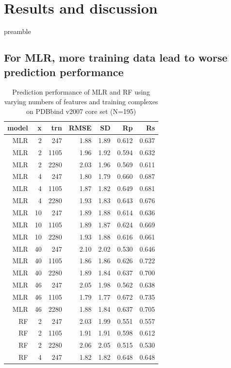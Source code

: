 \documentclass[journal=jacsat,manuscript=article]{achemso}
\begin{document}
\section{Results and discussion}

preamble

\subsection{For MLR, more training data lead to worse prediction performance}

\begin{table}
\caption{Prediction performance of MLR and RF using varying numbers of features and training complexes on PDBbind v2007 core set (N=195)}
\label{tbl:performance}
\begin{tabular}{rrrrrrr}
\hline
model & x & trn & RMSE & SD & Rp & Rs\\
\hline
MLR &  2 &  247 & 1.88 & 1.89 & 0.612 & 0.637\\
MLR &  2 & 1105 & 1.96 & 1.92 & 0.594 & 0.632\\
MLR &  2 & 2280 & 2.03 & 1.96 & 0.569 & 0.611\\
MLR &  4 &  247 & 1.80 & 1.79 & 0.660 & 0.687\\
MLR &  4 & 1105 & 1.87 & 1.82 & 0.649 & 0.681\\
MLR &  4 & 2280 & 1.93 & 1.83 & 0.643 & 0.676\\
MLR & 10 &  247 & 1.89 & 1.88 & 0.614 & 0.636\\
MLR & 10 & 1105 & 1.89 & 1.87 & 0.624 & 0.669\\
MLR & 10 & 2280 & 1.93 & 1.88 & 0.616 & 0.661\\
MLR & 40 &  247 & 2.10 & 2.02 & 0.530 & 0.646\\
MLR & 40 & 1105 & 1.86 & 1.86 & 0.626 & 0.722\\
MLR & 40 & 2280 & 1.89 & 1.84 & 0.637 & 0.700\\
MLR & 46 &  247 & 2.05 & 1.98 & 0.562 & 0.638\\
MLR & 46 & 1105 & 1.79 & 1.77 & 0.672 & 0.735\\
MLR & 46 & 2280 & 1.88 & 1.84 & 0.637 & 0.705\\
 RF &  2 &  247 & 2.03 & 1.99 & 0.551 & 0.557\\
 RF &  2 & 1105 & 1.91 & 1.91 & 0.598 & 0.612\\
 RF &  2 & 2280 & 2.06 & 2.05 & 0.515 & 0.530\\
 RF &  4 &  247 & 1.82 & 1.82 & 0.648 & 0.648\\

\end{tabular}
\end{table}
\end{document}
